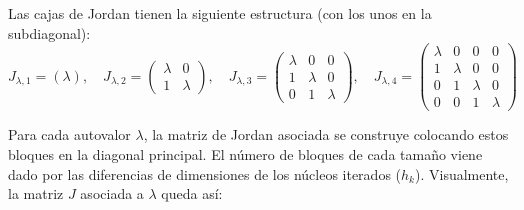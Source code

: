 Las cajas de Jordan tienen la siguiente estructura (con los unos en la subdiagonal):
\[
    J_{\lambda, 1} = (\lambda), \quad 
    J_{\lambda, 2} = \begin{pmatrix} \lambda & 0 \\ 1 & \lambda \end{pmatrix}, \quad 
    J_{\lambda, 3} = \begin{pmatrix} \lambda & 0 & 0 \\ 1 & \lambda & 0 \\ 0 & 1 & \lambda \end{pmatrix}, \quad 
    J_{\lambda, 4} = \begin{pmatrix} \lambda & 0 & 0 & 0 \\ 1 & \lambda & 0 & 0 \\ 0 & 1 & \lambda & 0 \\ 0 & 0 & 1 & \lambda \end{pmatrix}
\]

Para cada autovalor $\lambda$, la matriz de Jordan asociada se construye colocando estos bloques en la diagonal principal. El número de bloques de cada tamaño viene dado por las diferencias de dimensiones de los núcleos iterados ($h_k$). Visualmente, la matriz $J$ asociada a $\lambda$ queda así:

